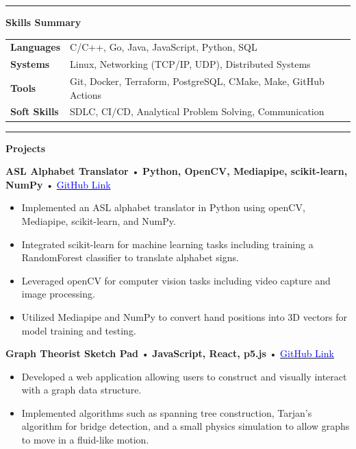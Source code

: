 \documentclass[10pt]{article}
\newcommand{\resumesection}[1]{
  \vspace{-5pt}
  \noindent\rule{\linewidth}{0.4pt}
  \par
  {\centering\large\bfseries #1\par}
  \vspace{2pt}
}
\newcommand{\nicelink}[2]{%
    \href{#1}{\textcolor{blue}{#2}}%
}
\newcommand{\project}[4]{%
  {\textbf{#1}} • {\textbf{#2}} • {\nicelink{#3}{GitHub Link}} \\[-2pt]%
  \vspace{-10pt}
  #4%
  \vspace{4pt}%
}
\begin{document}
    \resumesection{Skills Summary}

    \begin{tabularx}{\textwidth}{l X}

        \textbf{Languages} & C/C++, Go, Java, JavaScript, Python, SQL \\
        \textbf{Systems} & Linux, Networking (TCP/IP, UDP), Distributed Systems \\
        \textbf{Tools} & Git, Docker, Terraform, PostgreSQL, CMake, Make, GitHub Actions \\
        \textbf{Soft Skills} & SDLC, CI/CD, Analytical Problem Solving, Communication \\

    \end{tabularx}

    \vspace{10pt}
    \resumesection{Projects}

    \project
        {ASL Alphabet Translator}
        {Python, OpenCV, Mediapipe, scikit-learn, NumPy}
        {https://github.com/SamStan4/ASL-alphabet-translator}
        {%
            \begin{itemize}
                \item Implemented an ASL alphabet translator in Python using openCV, Mediapipe, scikit-learn, and NumPy.
                \item Integrated scikit-learn for machine learning tasks including training a RandomForest classifier to translate alphabet signs.
                \item Leveraged openCV for computer vision tasks including video capture and image processing.
                \item Utilized Mediapipe and NumPy to convert hand positions into 3D vectors for model training and testing.
            \end{itemize}
        }

    \project
        {Graph Theorist Sketch Pad}
        {JavaScript, React, p5.js}
        {https://github.com/SamStan4/graph-theorist-sketch-pad/tree/main}
        {%
            \begin{itemize}
                \item Developed a web application allowing users to construct and visually interact with a graph data structure.
                \item Implemented algorithms such as spanning tree construction, Tarjan’s algorithm for bridge detection, and a small physics simulation to allow graphs to move in a fluid-like motion.
            \end{itemize}
        }
\end{document}
